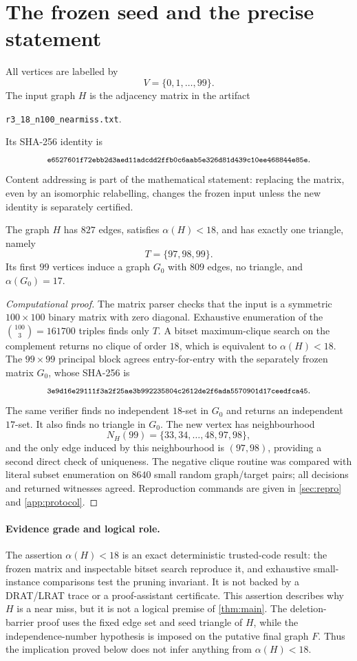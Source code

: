 \section{The frozen seed and the precise statement}

All vertices are labelled by
\[
  V=\{0,1,\ldots,99\}.
\]
The input graph \(H\) is the adjacency matrix in the artifact
\begin{center}
\texttt{r3\_18\_n100\_nearmiss.txt}.
\end{center}
Its SHA-256 identity is
\[
\sha{e6527601f72ebb2d3aed11adcdd2ffb0c6aab5e326d81d439c10ee468844e85e}.
\]
Content addressing is part of the mathematical statement: replacing the
matrix, even by an isomorphic relabelling, changes the frozen input unless the
new identity is separately certified.

\begin{lemma}\label{lem:seed}
The graph \(H\) has \(827\) edges, satisfies \(\alpha(H)<18\), and has exactly
one triangle, namely
\[
  T=\{97,98,99\}.
\]
Its first \(99\) vertices induce a graph \(G_0\) with \(809\) edges,
no triangle, and \(\alpha(G_0)=17\).
\end{lemma}

\begin{proof}[Computational proof]
The matrix parser checks that the input is a symmetric \(100\times100\)
binary matrix with zero diagonal.  Exhaustive enumeration of the
\(\binom{100}{3}=161700\) triples finds only \(T\).  A bitset maximum-clique
search on the complement returns no clique of order \(18\), which is
equivalent to \(\alpha(H)<18\).  The \(99\times99\) principal block agrees
entry-for-entry with the separately frozen matrix \(G_0\), whose SHA-256 is
\[
\sha{3e9d16e29111f3a2f25ae3b992235804c2612de2f6ada5570901d17ceedfca45}.
\]
The same verifier finds no independent \(18\)-set in \(G_0\) and returns an
independent \(17\)-set.  It also finds no triangle in \(G_0\).  The new vertex
has neighbourhood
\[
 N_H(99)=\{33,34,\ldots,48,97,98\},
\]
and the only edge induced by this neighbourhood is \((97,98)\), providing a
second direct check of uniqueness.  The negative clique routine was compared
with literal subset enumeration on \(8640\) small random graph/target pairs;
all decisions and returned witnesses agreed.  Reproduction commands are
given in \cref{sec:repro} and \cref{app:protocol}.
\end{proof}

\paragraph{Evidence grade and logical role.}
The assertion \(\alpha(H)<18\) is an exact deterministic trusted-code result:
the frozen matrix and inspectable bitset search reproduce it, and exhaustive
small-instance comparisons test the pruning invariant.  It is not backed by a
DRAT/LRAT trace or a proof-assistant certificate.  This assertion describes
why \(H\) is a near miss, but it is not a logical premise of
\cref{thm:main}.  The deletion-barrier proof uses the fixed edge set and seed
triangle of \(H\), while the independence-number hypothesis is imposed on the
putative final graph \(F\).  Thus the implication proved below does not infer
anything from \(\alpha(H)<18\).

